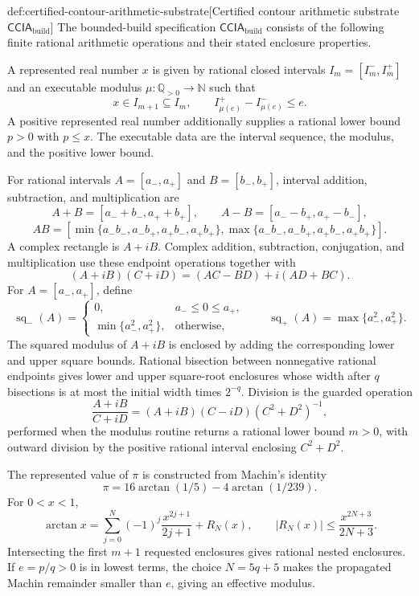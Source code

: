 \begin{definitionv}{def:certified-contour-arithmetic-substrate}[Certified contour arithmetic substrate \(\mathsf{CCIA}_{\mathrm{build}}\)]
The bounded-build specification \(\mathsf{CCIA}_{\mathrm{build}}\) consists of the following finite rational arithmetic operations and their stated enclosure properties.

A represented real number \(x\) is given by rational closed intervals \(I_m=[I_m^-,I_m^+]\) and an executable modulus \(\mu:\mathbb Q_{>0}\to\mathbb N\) such that
\[
x\in I_{m+1}\subseteq I_m,
\qquad
I_{\mu(e)}^+-I_{\mu(e)}^-\le e .
\]
A positive represented real number additionally supplies a rational lower bound \(p>0\) with \(p\le x\). The executable data are the interval sequence, the modulus, and the positive lower bound.

For rational intervals \(A=[a_-,a_+]\) and \(B=[b_-,b_+]\), interval addition, subtraction, and multiplication are
\[
A+B=[a_-+b_-,a_++b_+],
\qquad
A-B=[a_--b_+,a_+-b_-],
\]
\[
AB=
\left[
\min\{a_-b_-,a_-b_+,a_+b_-,a_+b_+\},
\max\{a_-b_-,a_-b_+,a_+b_-,a_+b_+\}
\right].
\]
A complex rectangle is \(A+iB\). Complex addition, subtraction, conjugation, and multiplication use these endpoint operations together with
\[
(A+iB)(C+iD)=(AC-BD)+i(AD+BC).
\]
For \(A=[a_-,a_+]\), define
\[
\operatorname{sq}_{-}(A)=
\begin{cases}
0,&a_-\le0\le a_+,\\
\min\{a_-^2,a_+^2\},&\text{otherwise},
\end{cases}
\qquad
\operatorname{sq}_{+}(A)=\max\{a_-^2,a_+^2\}.
\]
The squared modulus of \(A+iB\) is enclosed by adding the corresponding lower and upper square bounds. Rational bisection between nonnegative rational endpoints gives lower and upper square-root enclosures whose width after \(q\) bisections is at most the initial width times \(2^{-q}\). Division is the guarded operation
\[
\frac{A+iB}{C+iD}
=(A+iB)(C-iD)(C^2+D^2)^{-1},
\]
performed when the modulus routine returns a rational lower bound \(m>0\), with outward division by the positive rational interval enclosing \(C^2+D^2\).

The represented value of \(\pi\) is constructed from Machin's identity
\[
\pi=16\arctan(1/5)-4\arctan(1/239).
\]
For \(0<x<1\),
\[
\arctan x=\sum_{j=0}^{N}(-1)^j\frac{x^{2j+1}}{2j+1}+R_N(x),
\qquad
|R_N(x)|\le\frac{x^{2N+3}}{2N+3}.
\]
Intersecting the first \(m+1\) requested enclosures gives rational nested enclosures. If \(e=p/q>0\) is in lowest terms, the choice \(N=5q+5\) makes the propagated Machin remainder smaller than \(e\), giving an effective modulus.


\end{definitionv}
